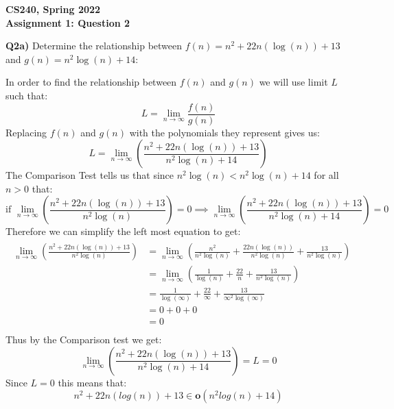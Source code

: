 \documentclass[12pt]{article}
\begin{document}
\begin{center}
{\Large\textbf{CS240, Spring 2022}}\\
\vspace{2mm}
{\Large\textbf{Assignment 1: Question 2}}\\
\vspace{3mm}
\end{center}
\[ \]
\textbf{Q2a)} Determine the relationship between $f(n) = n^2 + 22n(\log(n)) + 13$ and $g(n) = n^2\log(n) + 14$:\\
\begin{adjustwidth}{0em}{0pt}
In order to find the relationship between $f(n)$ and $g(n)$ we will use limit $L$ such that:
\[ L = \lim_{n\to\infty}\frac{f(n)}{g(n)} \]
Replacing $f(n)$ and $g(n)$ with the polynomials they represent gives us:
\[ L = \lim_{n\to\infty}\left(\frac{n^2 + 22n(\log(n)) + 13}{n^2\log(n) + 14}\right) \]
The Comparison Test tells us that since $n^2\log(n) < n^2\log(n) + 14$ for all $n > 0$ that:
\[\text{if  } \lim_{n\to\infty}\left(\frac{n^2 + 22n(\log(n)) + 13}{n^2\log(n)}\right) = 0 \implies \lim_{n\to\infty}\left(\frac{n^2 + 22n(\log(n)) + 13}{n^2\log(n) + 14}\right) = 0 \]
Therefore we can simplify the left most equation to get:
\begin{align*}
    \begin{aligned}
       \lim_{n\to\infty}\left(\frac{n^2 + 22n(\log(n)) + 13}{n^2\log(n)}\right) &=\lim_{n\to\infty}\left(\frac{n^2}{n^2\log(n)}+\frac{22n(\log(n))}{n^2\log(n)}+\frac{13}{n^2\log(n)}\right)  \\
    	   &=\lim_{n\to\infty}\left(\frac{1}{\log(n)}+\frac{22}{n}+\frac{13}{n^2\log(n)}\right) \\
    	       	   &=\frac{1}{\log(\infty)}+\frac{22}{\infty}+\frac{13}{\infty^2\log(\infty)} \\
    	       	   &=0 + 0  + 0 \\
    	       	   &=0\\
    \end{aligned}
\end{align*}
Thus by the Comparison test we get:
\[ \lim_{n\to\infty}\left(\frac{n^2 + 22n(\log(n)) + 13}{n^2\log(n) + 14}\right) = L = 0 \]
Since $L = 0$ this means that:
\[ n^2 + 22n(log(n)) + 13 \in \textbf{o}(n^2log(n) + 14) \] 
\end{adjustwidth}
\newpage
\end{document}
